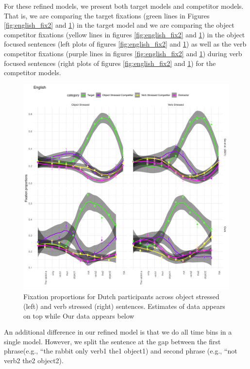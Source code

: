 For these refined models, we present both target models and competitor models. That is, we are comparing the target fixations (green lines in Figures \ref{fig:english_fix2} and \ref{fig:dutch_fix2}) in the target model and we are comparing the object competitor fixations (yellow lines in figures \ref{fig:english_fix2} and \ref{fig:dutch_fix2}) in the object focused sentences (left plots of figures \ref{fig:english_fix2} and \ref{fig:dutch_fix2}) as well as the verb competitor fixations (purple lines in figures \ref{fig:english_fix2} and \ref{fig:dutch_fix2}) during verb focused sentences (right plots of figures \ref{fig:english_fix2} and \ref{fig:dutch_fix2}) for the competitor models. 

\begin{figure}[H]  %
    \centering
    \includegraphics[width=\textwidth,height=\textheight,keepaspectratio]{viz/dutch_fix2.png}
    \caption{Fixation proportions for Dutch participants across object stressed (left) and verb stressed (right) sentences. Estimates of \cite{Ge2021} data appears on top while Our data appears below}
    \label{fig:dutch_fix2}
\end{figure}

An additional difference in our refined model is that we do all time bins in a single model. However, we split the sentence at the gap between the first phrase(e.g., ``the rabbit only verb1 the1 object1) and second phrase (e.g., ``not verb2 the2 object2). 

